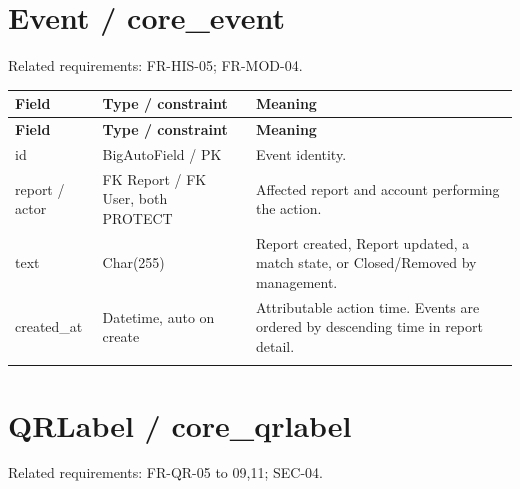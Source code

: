 \documentclass[12pt,a4paper,oneside]{report}
\begin{document}

\section{Event / core\_event}

Related requirements: FR-HIS-05; FR-MOD-04.

\begin{longtable}{@{}P{0.24\dimexpr\textwidth-24pt\relax}P{0.28\dimexpr\textwidth-24pt\relax}P{0.48\dimexpr\textwidth-24pt\relax}@{}}

\toprule \textbf{Field} & \textbf{Type / constraint} & \textbf{Meaning} \\ \midrule\endfirsthead

\toprule \textbf{Field} & \textbf{Type / constraint} & \textbf{Meaning} \\ \midrule\endhead

\bottomrule\endfoot

id & BigAutoField / PK & Event identity. \\ \addlinespace[3pt]

report / actor & FK Report / FK User, both PROTECT & Affected report and account performing the action. \\ \addlinespace[3pt]

text & Char(255) & Report created, Report updated, a match state, or Closed/Removed by management. \\ \addlinespace[3pt]

created\_at & Datetime, auto on create & Attributable action time. Events are ordered by descending time in report detail. \\ \addlinespace[3pt]

\end{longtable}


\section{QRLabel / core\_qrlabel}

Related requirements: FR-QR-05 to 09,11; SEC-04.
\end{document}
